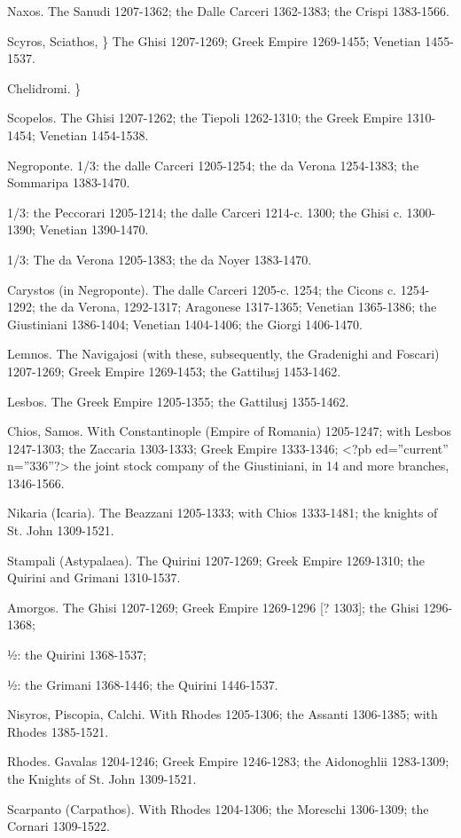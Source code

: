 Naxos.
The Sanudi 1207-1362; the Dalle Carceri 1362-1383; the Crispi 1383-1566.

Scyros, Sciathos, \} The Ghisi 1207-1269; Greek Empire 1269-1455; Venetian 1455-1537.

Chelidromi. \}

Scopelos.
The Ghisi 1207-1262; the Tiepoli 1262-1310; the Greek Empire 1310-1454; Venetian 1454-1538.

Negroponte.
\texthebrew{1/3}: the dalle Carceri 1205-1254; the da Verona 1254-1383; the Sommaripa 1383-1470.

\texthebrew{1/3}: the Peccorari 1205-1214; the dalle Carceri 1214-c. 1300; the Ghisi c. 1300-1390; Venetian 1390-1470.

\texthebrew{1/3}: The da Verona 1205-1383; the da Noyer 1383-1470.

Carystos (in Negroponte).
The dalle Carceri 1205-c. 1254; the Cicons c. 1254-1292; the da Verona, 1292-1317; Aragonese 1317-1365; Venetian 1365-1386; the Giustiniani 1386-1404; Venetian 1404-1406; the Giorgi 1406-1470.

Lemnos.
The Navigajosi (with these, subsequently, the Gradenighi and Foscari) 1207-1269; Greek Empire 1269-1453; the Gattilusj 1453-1462.

Lesbos.
The Greek Empire 1205-1355; the Gattilusj 1355-1462.

Chios, Samos.
With Constantinople (Empire of Romania) 1205-1247; with Lesbos 1247-1303; the Zaccaria 1303-1333; Greek Empire 1333-1346; <?pb ed=''current'' n=''336''?> the joint stock company of the Giustiniani, in 14 and more branches, 1346-1566.

Nikaria (Icaria).
The Beazzani 1205-1333; with Chios 1333-1481; the knights of St. John 1309-1521.

Stampali (Astypalaea).
The Quirini 1207-1269; Greek Empire 1269-1310; the Quirini and Grimani 1310-1537.

Amorgos.
The Ghisi 1207-1269; Greek Empire 1269-1296 [? 1303]; the Ghisi 1296-1368;

½: the Quirini 1368-1537;

½: the Grimani 1368-1446; the Quirini 1446-1537.

Nisyros, Piscopia, Calchi.
With Rhodes 1205-1306; the Assanti 1306-1385; with Rhodes 1385-1521.

Rhodes.
Gavalas 1204-1246; Greek Empire 1246-1283; the Aidonoghlii 1283-1309; the Knights of St. John 1309-1521.

Scarpanto (Carpathos).
With Rhodes 1204-1306; the Moreschi 1306-1309; the Cornari 1309-1522.

